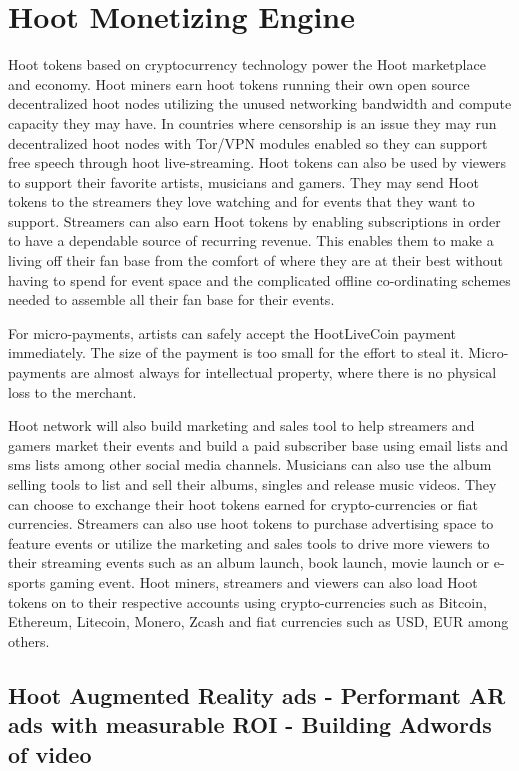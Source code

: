 \documentclass{article}
\begin{document}
\section{Hoot Monetizing Engine}
Hoot tokens based on cryptocurrency technology power the Hoot marketplace and economy. Hoot miners earn hoot tokens running their own open source decentralized hoot nodes utilizing the unused networking bandwidth and compute capacity they may have. In countries where censorship is an issue they may run decentralized hoot nodes with Tor/VPN modules enabled so they can support free speech through hoot live-streaming. Hoot tokens can also be used by viewers to support their favorite artists, musicians and gamers. They may send Hoot tokens to the streamers they love watching and for events that they want to support. Streamers can also earn Hoot tokens by enabling subscriptions in order to have a dependable source of recurring revenue. This enables them to make a living off their fan base from the comfort of where they are at their best without having to spend for event space and the complicated offline co-ordinating schemes needed to assemble all their fan base for their events.

For micro-payments, artists can safely accept the HootLiveCoin payment immediately. The size of the payment is too small for the effort to steal it. Micro-payments are almost always for intellectual property, where there is no physical loss to the merchant.

 Hoot network will also build marketing and sales tool to help streamers and gamers market their events and build a paid subscriber base using email lists and sms lists among other social media channels. 
Musicians can also use the album selling tools to list and sell their albums, singles and release music videos. They can choose to exchange their hoot tokens earned for crypto-currencies or fiat currencies.
 Streamers can also use hoot tokens to purchase advertising space to feature events or utilize the marketing and sales tools to drive more viewers to their streaming events such as an album launch, book launch, movie launch or e-sports gaming event. Hoot miners, streamers and viewers can also load Hoot tokens on to their respective accounts using crypto-currencies such as Bitcoin, Ethereum, Litecoin, Monero, Zcash and fiat currencies such as USD, EUR among others.

\subsection{Hoot Augmented Reality ads - Performant AR ads with measurable ROI - Building Adwords of video }
\end{document}
